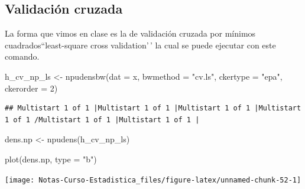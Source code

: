 \documentclass[
  12pt,
]{book}
\newenvironment{Shaded}{\begin{snugshade}}{\end{snugshade}}
\newcommand{\AttributeTok}[1]{\textcolor[rgb]{0.77,0.63,0.00}{#1}}
\newcommand{\DecValTok}[1]{\textcolor[rgb]{0.00,0.00,0.81}{#1}}
\newcommand{\FunctionTok}[1]{\textcolor[rgb]{0.00,0.00,0.00}{#1}}
\newcommand{\NormalTok}[1]{#1}
\newcommand{\OtherTok}[1]{\textcolor[rgb]{0.56,0.35,0.01}{#1}}
\newcommand{\StringTok}[1]{\textcolor[rgb]{0.31,0.60,0.02}{#1}}
\theoremstyle{definition}
\theoremstyle{definition}
\theoremstyle{definition}
\theoremstyle{remark}
\begin{document}
\hypertarget{validaciuxf3n-cruzada-1}{%
\subsection{Validación cruzada}\label{validaciuxf3n-cruzada-1}}

La forma que vimos en clase es la de validación cruzada por mínimos
cuadrados``least-square cross validation'\,' la cual se puede ejecutar
con este comando.

\begin{Shaded}
\begin{Highlighting}[]
\NormalTok{h\_cv\_np\_ls }\OtherTok{\textless{}{-}} \FunctionTok{npudensbw}\NormalTok{(}\AttributeTok{dat =}\NormalTok{ x, }\AttributeTok{bwmethod =} \StringTok{"cv.ls"}\NormalTok{, }
    \AttributeTok{ckertype =} \StringTok{"epa"}\NormalTok{, }\AttributeTok{ckerorder =} \DecValTok{2}\NormalTok{)}
\end{Highlighting}
\end{Shaded}

\begin{verbatim}
## Multistart 1 of 1 |Multistart 1 of 1 |Multistart 1 of 1 |Multistart 1 of 1 /Multistart 1 of 1 |Multistart 1 of 1 |                   
\end{verbatim}

\begin{Shaded}
\begin{Highlighting}[]
\NormalTok{dens.np }\OtherTok{\textless{}{-}} \FunctionTok{npudens}\NormalTok{(h\_cv\_np\_ls)}

\FunctionTok{plot}\NormalTok{(dens.np, }\AttributeTok{type =} \StringTok{"b"}\NormalTok{)}
\end{Highlighting}
\end{Shaded}

\begin{center}\texttt{[image: Notas-Curso-Estadistica\_files/figure-latex/unnamed-chunk-52-1]} \end{center}
\end{document}
